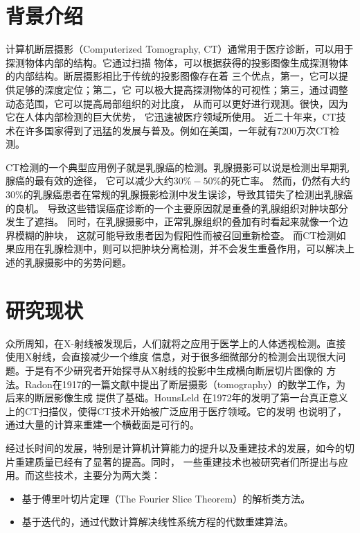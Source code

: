 \section{背景介绍}
计算机断层摄影（Computerized Tomography, CT）通常用于医疗诊断，可以用于探测物体内部的结构。它通过扫描
物体，可以根据获得的投影图像生成探测物体的内部结构。断层摄影相比于传统的投影图像存在着
三个优点，第一，它可以提供足够的深度定位；第二，它
可以极大提高探测物体的可视性；第三，通过调整动态范围，它可以提高局部组织的对比度，
从而可以更好进行观测。很快，因为它在人体内部检测的巨大优势，
它迅速被医疗领域所使用\cite{dobbins2003digital}。
近二十年来，CT技术在许多国家得到了迅猛的发展与普及。例如在美国，一年就有$7200$万次CT检测\cite{berrington2009projected}。

CT检测的一个典型应用例子就是乳腺癌的检测。乳腺摄影可以说是检测出早期乳腺癌的最有效的途径，
它可以减少大约$30\%-50\%$的死亡率。
然而，仍然有大约$30\%$的乳腺癌患者在常规的乳腺摄影检测中发生误诊，导致其错失了检测出乳腺癌的良机。
导致这些错误癌症诊断的一个主要原因就是重叠的乳腺组织对肿块部分发生了遮挡。
同时，在乳腺摄影中，正常乳腺组织的叠加有时看起来就像一个边界模糊的肿块，
这就可能导致患者因为假阳性而被召回重新检查。
而CT检测如果应用在乳腺检测中，则可以把肿块分离检测，并不会发生重叠作用，可以解决上述的乳腺摄影中的劣势问题。

\section{研究现状}
众所周知，在X-射线被发现后，人们就将之应用于医学上的人体透视检测。直接使用X射线，会直接减少一个维度
信息，对于很多细微部分的检测会出现很大问题。于是有不少研究者开始探寻从X射线的投影中生成横向断层切片图像的
方法。Radon在1917的一篇文献中提出了断层摄影（tomography）的数学工作\cite{radon1986}，为后来的断层影像生成
提供了基础。HounsLeld 在1972年的发明了第一台真正意义上的CT扫描仪，使得CT技术开始被广泛应用于医疗领域。它的发明
也说明了，通过大量的计算来重建一个横截面是可行的。

经过长时间的发展，特别是计算机计算能力的提升以及重建技术的发展，如今的切片重建质量已经有了显著的提高。同时，
一些重建技术也被研究者们所提出与应用。而这些技术，主要分为两大类\cite{mueller1998fast}\cite{chlewicki20013d}：
\begin{itemize}
\item 基于傅里叶切片定理（The Fourier Slice Theorem）\cite{bracewell1986fourier}的解析类方法。
\item 基于迭代的，通过代数计算解决线性系统方程的代数重建算法。
\end{itemize}

